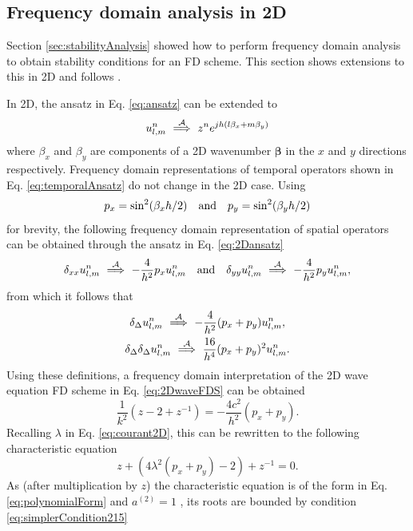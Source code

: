 \subsection{Frequency domain analysis in 2D}\label{sec:stability2Dwave}
Section \ref{sec:stabilityAnalysis} showed how to perform frequency domain analysis to obtain stability conditions for an FD scheme. This section shows extensions to this in 2D and follows \cite[Ch. 10]{theBible}.

In 2D, the ansatz in Eq. \eqref{eq:ansatz} can be extended to 
\begin{equation}\label{eq:2Dansatz}
    u_{l,m}^n \ \overset{\mathcal{A}}{\Longrightarrow}\  z^n e^{jh(l\beta_x + m\beta_y)}
\end{equation}
where $\beta_x$ and $\beta_y$ are components of a 2D wavenumber $\boldsymbol{\beta}$ in the $x$ and $y$ directions respectively. Frequency domain representations of temporal operators shown in Eq. \eqref{eq:temporalAnsatz} do not change in the 2D case. Using 
\begin{equation}\label{eq:pxpy}
    p_x = \sin^2(\beta_x h/2) \quad \text{and} \quad p_y = \sin^2(\beta_y h/2)
\end{equation}
for brevity, the following frequency domain representation of spatial operators can be obtained through the ansatz in Eq. \eqref{eq:2Dansatz}
\begin{equation}
    \delta_{xx} u_{l,m}^n \ \overset{\mathcal{A}}{\Longrightarrow}\  -\frac{4}{h^2}p_x 
    u_{l,m}^n \quad \text{and} \quad \delta_{yy} u_{l,m}^n \ \overset{\mathcal{A}}{\Longrightarrow}\  -\frac{4}{h^2}p_y 
    u_{l,m}^n,
\end{equation}
from which it follows that
\begin{gather}
    \delta_{\Delta}u_{l,m}^n \ \overset{\mathcal{A}}{\Longrightarrow}\  -\frac{4}{h^2}(p_x + p_y)u_{l,m}^n,\label{eq:laplacianAnsatz}\\
    \delta_{\Delta}\delta_{\Delta}u_{l,m}^n \ \overset{\mathcal{A}}{\Longrightarrow}\  \frac{16}{h^4}(p_x + p_y)^2u_{l,m}^n.\label{eq:biharmonicAnsatz}
\end{gather}
%
Using these definitions, a frequency domain interpretation of the 2D wave equation FD scheme in Eq. \eqref{eq:2DwaveFDS} can be obtained
\begin{equation*}
    \frac{1}{k^2}\left(z - 2 +z^{-1}\right) = -\frac{4c^2}{h^2} (p_x + p_y).
\end{equation*}
Recalling $\lambda$ in Eq. \eqref{eq:courant2D}, this can be rewritten to the following characteristic equation
\begin{equation}
    z + \left(4\lambda^2(p_x + p_y)-2\right) +z^{-1} = 0.
\end{equation}
As (after multiplication by $z$) the characteristic equation is of the form in Eq. \eqref{eq:polynomialForm} and $a^{(2)} = 1$ , its roots are bounded by condition \eqref{eq:simplerCondition215} 
